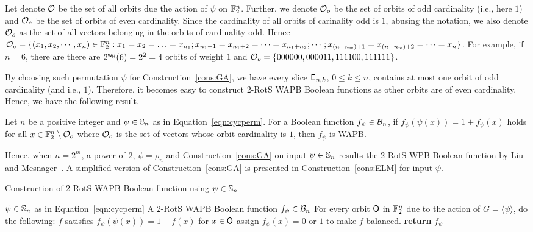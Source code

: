 \documentclass{llncs}
\begin{document}
\fi
Let denote $\mathcal{O}$ be the set of all orbits due the action of $\psi$ on $\mathbb{F}_2^n$. Further, we denote $\mathcal{O}_o$ be the set of orbits of odd cardinality (i.e., here $1$) and $\mathcal{O}_e$ be the set of orbits of even cardinality. Since the cardinality of all orbits of carinality odd is $1$, abusing the notation, we also denote $\mathcal{O}_o$ as the set of all vectors belonging in the orbits of cardinality odd. Hence %
$\mathcal{O}_o = \{(x_1, x_2, \cdots, x_n) \in \mathbb{F}_2^n : x_1 = x_2 = \ldots = x_{n_1}; x_{n_1 + 1} = x_{n_1 + 2} = \cdots = x_{n_1 + n_2}; \cdots ; x_{(n- n_w ) + 1}  = x_{(n- n_w ) + 2} = \cdots = x_n\}$.
For example, if $n = 6$, there are there are $2^{\mathsf{w_H}}(6) = 2^2 = 4$ orbits of weight $1$ and $\mathcal{O}_o = \{000000, 000011, 111100, 111111\}$. 

By choosing such permutation $\psi$ for Construction~\ref{cons:GA}, we have every slice $\mathsf{E}_{n,k}$, $0 \leq k \leq n$, contains at most one orbit of odd cardinality (and i.e., $1$). Therefore, it becomes easy to construct 2-RotS WAPB Boolean functions as other orbits are of even cardinality. Hence, we have the following result.
\begin{proposition}\label{prop:WAPB}
Let $n$ be a positive integer and $\psi \in \mathbb{S}_n$ as in Equation~\ref{eqn:cycperm}.
For a Boolean function $f_\psi \in \mathcal{B}_n$, if $f_\psi(\psi(x)) = 1+f_\psi(x)$ holds for all $x \in \mathbb{F}_2^n \setminus \mathcal{O}_o$ where $\mathcal{O}_o$ is the set of vectors whose orbit cardinality is $1$, then $f_\psi$ is WAPB.
\end{proposition}
Hence, when $n = 2^m$, a power of $2$, $\psi = \rho_n$ and Construction~\ref{cons:GA} on input $\psi \in \mathbb{S}_n$ results the 2-RotS WPB Boolean function by Liu and Mesnager~\cite{DCC:LiuMes19}. A simplified version of Construction~\ref{cons:GA} is presented in Construction~\ref{cons:ELM} for input $\psi$.

\begin{constr} 
	\scriptsize
\caption{Construction of 2-RotS WAPB Boolean function using $\psi \in \mathbb{S}_n$ \label{cons:ELM}}
\begin{algorithmic}
\Require $\psi \in \mathbb{S}_n$ as in Equation~\ref{eqn:cycperm}
\Ensure A $2$-RotS WAPB Boolean function $f_\psi \in \mathcal{B}_n$
\State For every orbit $\mathsf{O}$ in $\mathbb{F}_2^n$ due to the action of $G = \langle \psi \rangle$, do the following:
	\State $f$ satisfies $f_\psi(\psi(x)) = 1+f(x)$ for $x \in \mathsf{O}$
\EndIf
{}
	\State assign $f_\psi(x) = 0$ or $1$ to make $f$ balanced.
\EndIf
\State \textbf{return} $f_\psi$
\end{algorithmic}
\end{constr}
\end{document}
